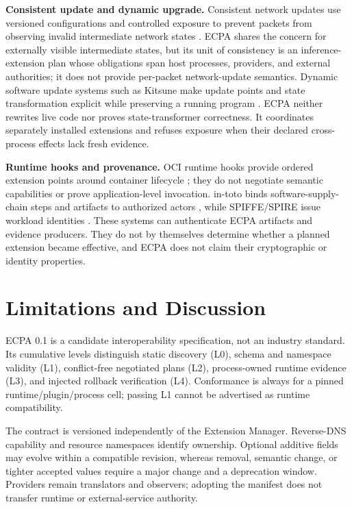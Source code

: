 \documentclass[letterpaper,twocolumn,10pt]{article}
\begin{document}
\textbf{Consistent update and dynamic upgrade.}  Consistent network updates
use versioned configurations and controlled exposure to prevent packets from
observing invalid intermediate network states \cite{reitblatt-update}.  ECPA
shares the concern for externally visible intermediate states, but its unit of
consistency is an inference-extension plan whose obligations span host
processes, providers, and external authorities; it does not provide per-packet
network-update semantics.  Dynamic software update systems such as Kitsune
make update points and state transformation explicit while preserving a
running program \cite{kitsune}.  ECPA neither rewrites live code nor proves
state-transformer correctness.  It coordinates separately installed
extensions and refuses exposure when their declared cross-process effects lack
fresh evidence.

\textbf{Runtime hooks and provenance.}  OCI runtime hooks provide ordered
extension points around container lifecycle \cite{oci-runtime}; they do not
negotiate semantic capabilities or prove application-level invocation.
in-toto binds software-supply-chain steps and artifacts to authorized actors
\cite{in-toto}, while SPIFFE/SPIRE issue workload identities
\cite{spiffe,spire}.  These systems can authenticate ECPA artifacts and evidence
producers.  They do not by themselves determine whether a planned extension
became effective, and ECPA does not claim their cryptographic or identity
properties.

\section{Limitations and Discussion}
ECPA 0.1 is a candidate interoperability specification, not an industry
standard.  Its cumulative levels distinguish static discovery (L0), schema and
namespace validity (L1), conflict-free negotiated plans (L2), process-owned
runtime evidence (L3), and injected rollback verification (L4).  Conformance
is always for a pinned runtime/plugin/process cell; passing L1 cannot be
advertised as runtime compatibility.

The contract is versioned independently of the Extension Manager.  Reverse-DNS
capability and resource namespaces identify ownership.  Optional additive
fields may evolve within a compatible revision, whereas removal, semantic
change, or tighter accepted values require a major change and a deprecation
window.  Providers remain translators and observers; adopting the manifest
does not transfer runtime or external-service authority.
\end{document}
